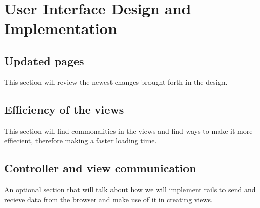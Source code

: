 \chapter{User Interface Design and Implementation}

\section{Updated pages}
This section will review the newest changes brought forth in the design.

\section{Efficiency of the views}
This section will find commonalities in the views and find ways to make it more effiecient, therefore making a faster loading time.

\section{Controller and view communication}
An optional section that will talk about how we will implement rails to send and recieve data from the browser and make use of it in creating views.
